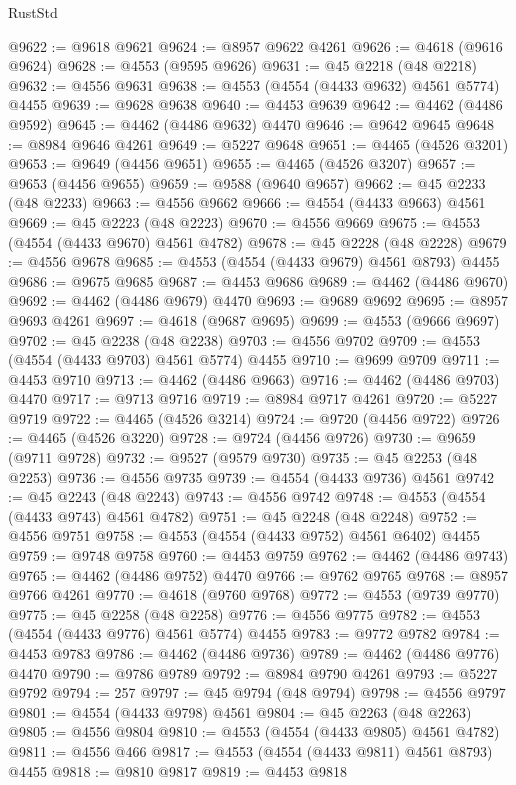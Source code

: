 \begin{lexlean}{RustStd}
\begin{coremodule}
@9622 := @9618 @9621
@9624 := @8957 @9622 @4261
@9626 := @4618 (@9616 @9624)
@9628 := @4553 (@9595 @9626)
@9631 := @45 @2218 (@48 @2218)
@9632 := @4556 @9631
@9638 := @4553 (@4554 (@4433 @9632) @4561 @5774) @4455
@9639 := @9628 @9638
@9640 := @4453 @9639
@9642 := @4462 (@4486 @9592)
@9645 := @4462 (@4486 @9632) @4470
@9646 := @9642 @9645
@9648 := @8984 @9646 @4261
@9649 := @5227 @9648
@9651 := @4465 (@4526 @3201)
@9653 := @9649 (@4456 @9651)
@9655 := @4465 (@4526 @3207)
@9657 := @9653 (@4456 @9655)
@9659 := @9588 (@9640 @9657)
@9662 := @45 @2233 (@48 @2233)
@9663 := @4556 @9662
@9666 := @4554 (@4433 @9663) @4561
@9669 := @45 @2223 (@48 @2223)
@9670 := @4556 @9669
@9675 := @4553 (@4554 (@4433 @9670) @4561 @4782)
@9678 := @45 @2228 (@48 @2228)
@9679 := @4556 @9678
@9685 := @4553 (@4554 (@4433 @9679) @4561 @8793) @4455
@9686 := @9675 @9685
@9687 := @4453 @9686
@9689 := @4462 (@4486 @9670)
@9692 := @4462 (@4486 @9679) @4470
@9693 := @9689 @9692
@9695 := @8957 @9693 @4261
@9697 := @4618 (@9687 @9695)
@9699 := @4553 (@9666 @9697)
@9702 := @45 @2238 (@48 @2238)
@9703 := @4556 @9702
@9709 := @4553 (@4554 (@4433 @9703) @4561 @5774) @4455
@9710 := @9699 @9709
@9711 := @4453 @9710
@9713 := @4462 (@4486 @9663)
@9716 := @4462 (@4486 @9703) @4470
@9717 := @9713 @9716
@9719 := @8984 @9717 @4261
@9720 := @5227 @9719
@9722 := @4465 (@4526 @3214)
@9724 := @9720 (@4456 @9722)
@9726 := @4465 (@4526 @3220)
@9728 := @9724 (@4456 @9726)
@9730 := @9659 (@9711 @9728)
@9732 := @9527 (@9579 @9730)
@9735 := @45 @2253 (@48 @2253)
@9736 := @4556 @9735
@9739 := @4554 (@4433 @9736) @4561
@9742 := @45 @2243 (@48 @2243)
@9743 := @4556 @9742
@9748 := @4553 (@4554 (@4433 @9743) @4561 @4782)
@9751 := @45 @2248 (@48 @2248)
@9752 := @4556 @9751
@9758 := @4553 (@4554 (@4433 @9752) @4561 @6402) @4455
@9759 := @9748 @9758
@9760 := @4453 @9759
@9762 := @4462 (@4486 @9743)
@9765 := @4462 (@4486 @9752) @4470
@9766 := @9762 @9765
@9768 := @8957 @9766 @4261
@9770 := @4618 (@9760 @9768)
@9772 := @4553 (@9739 @9770)
@9775 := @45 @2258 (@48 @2258)
@9776 := @4556 @9775
@9782 := @4553 (@4554 (@4433 @9776) @4561 @5774) @4455
@9783 := @9772 @9782
@9784 := @4453 @9783
@9786 := @4462 (@4486 @9736)
@9789 := @4462 (@4486 @9776) @4470
@9790 := @9786 @9789
@9792 := @8984 @9790 @4261
@9793 := @5227 @9792
@9794 := 257
@9797 := @45 @9794 (@48 @9794)
@9798 := @4556 @9797
@9801 := @4554 (@4433 @9798) @4561
@9804 := @45 @2263 (@48 @2263)
@9805 := @4556 @9804
@9810 := @4553 (@4554 (@4433 @9805) @4561 @4782)
@9811 := @4556 @466
@9817 := @4553 (@4554 (@4433 @9811) @4561 @8793) @4455
@9818 := @9810 @9817
@9819 := @4453 @9818

\end{coremodule}
\end{lexlean}
